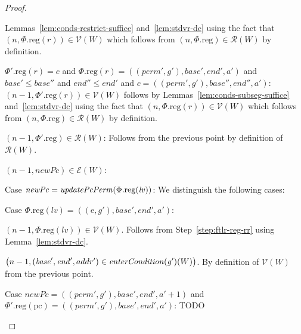 \documentclass[a4paper]{article}
\newcommand{\var}[1]{\mathit{#1}}
\newcommand{\lv}{\var{lv}}
\newcommand{\gl}{\var{g}}
\newcommand{\pcreg}{\mathrm{pc}}
\newcommand{\addr}{\var{a}}
\newcommand{\start}{\var{base}}
\newcommand{\addrend}{\var{end}}
\newcommand{\perm}{\var{perm}}
\newcommand{\plainproj}[1]{\mathrm{#1}}
\newcommand{\memreg}[1][\Phi]{#1.\plainproj{reg}}
\newcommand{\plainfun}[2]{
  \ifthenelse{\equal{#2}{}}
  {\mathit{#1}}
  {\mathit{#1}(#2)}
}
\newcommand{\updatePcPerm}[1]{\plainfun{updatePcPerm}{#1}}
\newcommand{\entryCond}[1]{\plainfun{enterCondition}{#1}}
\newcommand{\asmType}{\plaindom{AsmType}}
\newcommand{\plaindom}[1]{\mathrm{#1}}
\newcommand{\intr}[2]{\mathcal{#1}}
\newcommand{\valueintr}[1]{\intr{V}{#1}}
\newcommand{\exprintr}[1]{\intr{E}{#1}}
\newcommand{\regintr}[1]{\intr{R}{#1}}
\newcommand{\stdvr}{\valueintr{\asmType}}
\newcommand{\stder}{\exprintr{\asmType}}
\newcommand{\stdrr}{\regintr{\asmType}}
\newcommand{\npair}[2][n]{\left(#1,#2 \right)}
\newcommand{\plainperm}[1]{\mathrm{#1}}
\newcommand{\entry}{\plainperm{e}}
\begin{document}
\begin{proof}
\begin{enumproof}
\begin{enumproof}
\begin{enumproof}
        Lemmas~\ref{lem:conds-restrict-suffice} and~\ref{lem:stdvr-dc} using the
        fact that $\npair{\memreg(r)}\in\stdvr(W)$
        which follows from $\npair{\memreg}\in\stdrr(W)$ by
        definition.
      \item $\memreg[\Phi'](r) = \var{c}$ and $\memreg(r) =
        ((\perm',\gl'),\start',\addrend',\addr')$ and $\start' \leq \start''$ and
        $\addrend'' \leq \addrend'$ and $c =
        ((\perm',\gl'),\start'',\addrend'',\addr')$: \\
        $\npair[n-1]{\memreg[\Phi'](r)} \in \stdvr(W)$ follows by
        Lemmas~\ref{lem:conds-subseg-suffice} and~\ref{lem:stdvr-dc} using the
        fact that $\npair{\memreg(r)}\in\stdvr(W)$
        which follows from $\npair{\memreg}\in\stdrr(W)$ by definition.
      \end{enumproof}
    \item $\npair[n-1]{\memreg[\Phi']}\in\stdrr(W)$: Follows from the previous
      point by definition of $\stdrr(W)$.
    \item $\npair[n-1]{\var{newPc}} \in \stder(W)$:
      \begin{enumproof}
      \item Case $\var{newPc}= \updatePcPerm{\memreg(\lv)}$: We distinguish the
        following cases:
        \begin{enumproof}
        \item Case $\memreg(\lv) = ((\entry,\gl'),\start',\addrend',\addr')$:
          \begin{enumproof}
          \item $\npair[n-1]{\memreg(\lv)} \in \stdvr(W)$.  Follows from
            Step~\ref{step:ftlr-reg-rr} using Lemma~\ref{lem:stdvr-dc}.
          \item $\npair[n-1]{(\start',\addrend',addr') \in
              \entryCond{\gl'}(W)}$. By definition of $\stdvr(W)$ from the
            previous point.
          \item 
          \end{enumproof}
        \end{enumproof}
      \item Case $\var{newPc} = ((\perm',\gl'),\start',\addrend',\addr' + 1)$ and
        $\memreg[\Phi'](\pcreg) = ((\perm',\gl'),\start',\addrend',\addr')$: TODO
      \end{enumproof}
    \end{enumproof}
  \end{enumproof}
\end{proof}
\end{document}
